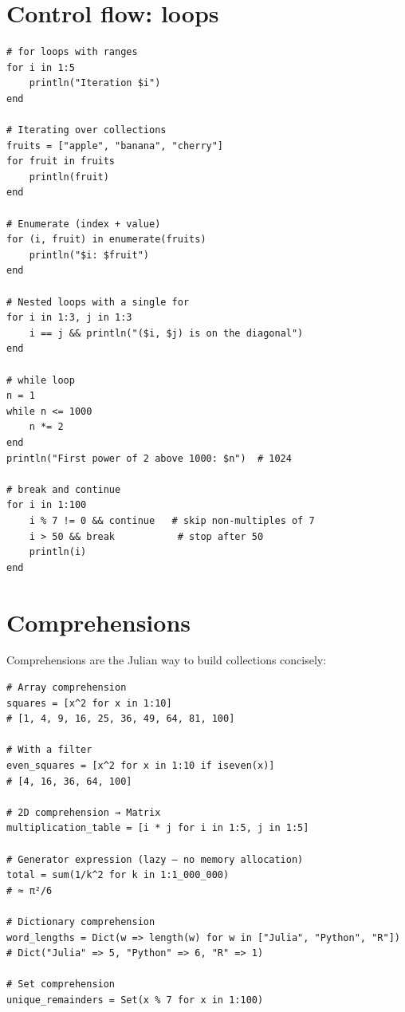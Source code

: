 \section{Control flow: loops}

\begin{verbatim}
# for loops with ranges
for i in 1:5
    println("Iteration $i")
end

# Iterating over collections
fruits = ["apple", "banana", "cherry"]
for fruit in fruits
    println(fruit)
end

# Enumerate (index + value)
for (i, fruit) in enumerate(fruits)
    println("$i: $fruit")
end

# Nested loops with a single for
for i in 1:3, j in 1:3
    i == j && println("($i, $j) is on the diagonal")
end

# while loop
n = 1
while n <= 1000
    n *= 2
end
println("First power of 2 above 1000: $n")  # 1024

# break and continue
for i in 1:100
    i % 7 != 0 && continue   # skip non-multiples of 7
    i > 50 && break           # stop after 50
    println(i)
end
\end{verbatim}

\section{Comprehensions}

Comprehensions are the Julian way to build collections concisely:

\begin{verbatim}
# Array comprehension
squares = [x^2 for x in 1:10]
# [1, 4, 9, 16, 25, 36, 49, 64, 81, 100]

# With a filter
even_squares = [x^2 for x in 1:10 if iseven(x)]
# [4, 16, 36, 64, 100]

# 2D comprehension → Matrix
multiplication_table = [i * j for i in 1:5, j in 1:5]

# Generator expression (lazy — no memory allocation)
total = sum(1/k^2 for k in 1:1_000_000)
# ≈ π²/6

# Dictionary comprehension
word_lengths = Dict(w => length(w) for w in ["Julia", "Python", "R"])
# Dict("Julia" => 5, "Python" => 6, "R" => 1)

# Set comprehension
unique_remainders = Set(x % 7 for x in 1:100)
\end{verbatim}

